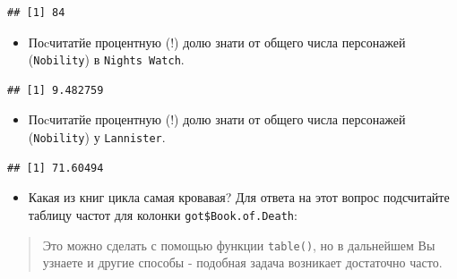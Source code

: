 \documentclass[]{book}
\newenvironment{Shaded}{\begin{snugshade}}{\end{snugshade}}
\newcommand{\KeywordTok}[1]{\textcolor[rgb]{0.13,0.29,0.53}{\textbf{#1}}}
\newcommand{\DecValTok}[1]{\textcolor[rgb]{0.00,0.00,0.81}{#1}}
\newcommand{\StringTok}[1]{\textcolor[rgb]{0.31,0.60,0.02}{#1}}
\newcommand{\OperatorTok}[1]{\textcolor[rgb]{0.81,0.36,0.00}{\textbf{#1}}}
\newcommand{\NormalTok}[1]{#1}
\providecommand{\tightlist}{%
  \setlength{\itemsep}{0pt}\setlength{\parskip}{0pt}}
\begin{document}
\begin{verbatim}
## [1] 84
\end{verbatim}

\begin{itemize}
\tightlist
\item
  Поcчитатйе процентную (!) долю знати от общего числа персонажей
  (\texttt{Nobility}) в \texttt{Night\textquotesingle{}s\ Watch}.
\end{itemize}

\begin{Shaded}
\end{Shaded}

\begin{verbatim}
## [1] 9.482759
\end{verbatim}

\begin{itemize}
\tightlist
\item
  Поcчитатйе процентную (!) долю знати от общего числа персонажей
  (\texttt{Nobility}) у \texttt{Lannister}.
\end{itemize}

\begin{Shaded}
\end{Shaded}

\begin{verbatim}
## [1] 71.60494
\end{verbatim}

\begin{itemize}
\tightlist
\item
  Какая из книг цикла самая кровавая? Для ответа на этот вопрос
  подсчитайте таблицу частот для колонки \texttt{got\$Book.of.Death}:
\end{itemize}

\begin{quote}
Это можно сделать с помощью функции \texttt{table()}, но в дальнейшем Вы
узнаете и другие способы - подобная задача возникает достаточно часто.
\end{quote}
\end{document}
